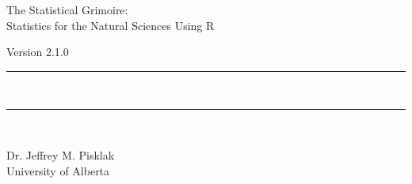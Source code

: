 {}
{
\Huge\centering\headingfont The Statistical Grimoire: \\
Statistics for the Natural Sciences Using R\\

\vspace{0.5em}

\small\mdseries\raggedright Version 2.1.0

\rule{\linewidth}{1pt}\\[-6mm]
\rule{\linewidth}{2pt}\\

}

\vskip 2cm

\begin{center}
\Large Dr. Jeffrey M. Pisklak \\
\vspace{0.5em}
\large University of Alberta
\end{center}

\vfill

